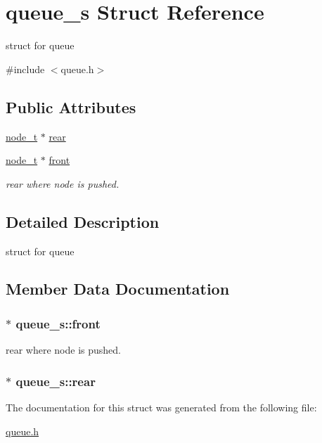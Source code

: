 \hypertarget{structqueue__s}{\section{queue\-\_\-s Struct Reference}
\label{structqueue__s}
}


struct for queue  




{\ttfamily \#include $<$queue.\-h$>$}

\subsection*{Public Attributes}
\begin{DoxyCompactItemize}
\item 
\hyperlink{node_8h_a33b99e5345d46cf63926673aa2b9ff83}{node\-\_\-t} $\ast$ \hyperlink{structqueue__s_a5d76357b63fe27ded318b721be63f1a3}{rear}
\item 
\hyperlink{node_8h_a33b99e5345d46cf63926673aa2b9ff83}{node\-\_\-t} $\ast$ \hyperlink{structqueue__s_acea675d80d267dea0c72a9aa9ac09658}{front}
\begin{DoxyCompactList}\small\item\em rear where node is pushed. \end{DoxyCompactList}\end{DoxyCompactItemize}


\subsection{Detailed Description}
struct for queue 

\subsection{Member Data Documentation}
\hypertarget{structqueue__s_acea675d80d267dea0c72a9aa9ac09658}{
\subsubsection[{front}]{$\ast$ queue\-\_\-s\-::front}}\label{structqueue__s_acea675d80d267dea0c72a9aa9ac09658}


rear where node is pushed. 

\hypertarget{structqueue__s_a5d76357b63fe27ded318b721be63f1a3}{
\subsubsection[{rear}]{$\ast$ queue\-\_\-s\-::rear}}\label{structqueue__s_a5d76357b63fe27ded318b721be63f1a3}


The documentation for this struct was generated from the following file\-:\begin{DoxyCompactItemize}
\item 
\hyperlink{queue_8h}{queue.\-h}\end{DoxyCompactItemize}

